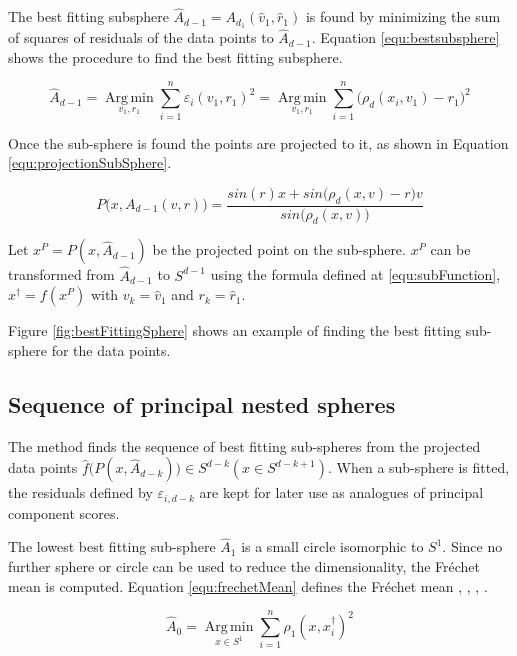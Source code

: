 The best fitting subsphere $\hat A_{d-1} = A_{d_1}(\hat v_1, \hat r_1)$ 
is found by minimizing the sum of squares of residuals of the data points to $\hat A_{d-1}$.
Equation \ref{equ:bestsubsphere} shows the procedure to find the best fitting subsphere.

\begin{equation}
 \hat A_{d-1}  = \operatorname*{Arg\,min}_{v_1, r_1} \sum_{i=1}^{n} \varepsilon_i ( v_1 , r_1 )^2 = \operatorname*{Arg\,min}_{v_1, r_1} \sum_{i=1}^{n} \big( \rho_d(x_i, v_1) - r_1 \big)^2
 \label{equ:bestsubsphere}
\end{equation}

Once the sub-sphere is found the points are projected to it, as shown in Equation \ref{equ:projectionSubSphere}.

\begin{equation}
 P\big( x, A_{d-1}(v, r) \big) = \frac{sin(r) x + sin\big(\rho_d(x, v) - r\big)v}{sin\big(\rho_d(x, v)\big)}
 \label{equ:projectionSubSphere}
\end{equation}

Let $x^P = P(x,\hat A_{d-1})$ be the projected point on the sub-sphere.
$x^P$ can be transformed from $\hat A_{d-1}$ to $S^{d-1}$ using the formula defined at \ref{equ:subFunction},
$x^\dagger = f(x^P)$ with $v_k = \hat v_1$ and $r_k = \hat r_1$.

Figure \ref{fig:bestFittingSphere} shows an example of finding the best fitting sub-sphere for the data points.

\subsection{Sequence of principal nested spheres}

The method finds the sequence of best fitting sub-spheres from 
the projected data points $\hat f \big ( P(x, \hat A_{d-k}) \big) \in S^{d-k} ( x \in S^{d-k+1})$. 
When a sub-sphere is fitted, the residuals defined by $\varepsilon_{i, d - k}$ are kept for later use as 
analogues of principal component scores.

The lowest best fitting sub-sphere $\hat A_1$ is a small circle isomorphic to $S^1$.
Since no further sphere or circle can be used to reduce the dimensionality, 
the Fr\'{e}chet mean is computed. 
Equation \ref{equ:frechetMean} defines the Fr\'{e}chet mean \cite{frechet1944integrale}, \cite{frechet1948elements}, \cite{karcher1977riemannian}, \cite{bhattacharya2003large}.

\begin{equation}
 \hat A_0 = \operatorname*{Arg\,min}_{x \in S^1} \sum_{i = 1}^n \rho_1(x, x_i^\dagger)^2
 \label{equ:frechetMean}
\end{equation}

